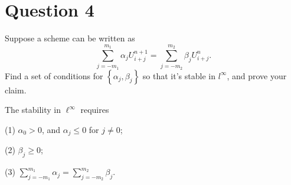 \section{Question 4}

\begin{question}
   Suppose a scheme can be written as
    $$
    \sum_{j=-m_1}^{m_1} \alpha_j U_{i+j}^{n+1}=\sum_{j=-m_2}^{m_2} \beta_j U_{i+j}^n .
    $$
    Find a set of conditions for $\left\{\alpha_j, \beta_j\right\}$ so that it's stable in $l^{\infty}$, and prove your claim.
\end{question}

\begin{answer}
    The stability in $\ell^{\infty}$ requires
    
    (1) $\alpha_0>0$, and $\alpha_j \leqslant 0$ for $j \neq 0$;
    
    (2) $\beta_j \geqslant 0$;
    
    (3) $\sum_{j=-m_1}^{m_1} \alpha_j=\sum_{j=-m_2}^{m_2} \beta_j$.
    

\end{answer}
